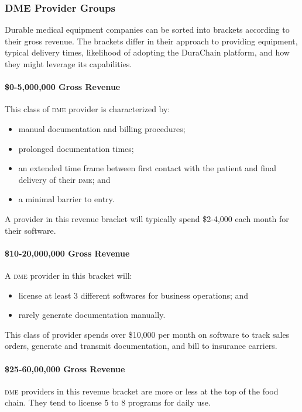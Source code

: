   \subsubsection{DME Provider Groups}
  Durable medical equipment companies can be sorted into brackets according to their gross revenue. The brackets differ in their approach to providing equipment, typical delivery times, likelihood of adopting the DuraChain platform, and how they might leverage its capabilities.%

  \paragraph{\$0-5,000,000 Gross Revenue}
  This class of \textsc{dme} provider is characterized by:%
  \begin{itemize}
    \item manual documentation and billing procedures;
    \item prolonged documentation times;
    \item an extended time frame between first contact with the patient and final delivery of their \textsc{dme}; and
    \item a minimal barrier to entry.
  \end{itemize}
  A provider in this revenue bracket will typically spend \$2-4,000 each month for their software.%

  \paragraph{\$10-20,000,000 Gross Revenue}
  A \textsc{dme} provider in this bracket will:%
  \begin{itemize}
    \item license at least 3 different softwares for business operations; and
    \item rarely generate documentation manually.
  \end{itemize}
  This class of provider spends over \$10,000 per month on software to track sales orders, generate and transmit documentation, and bill to insurance carriers.%

  \paragraph{\$25-60,00,000 Gross Revenue}
  \textsc{dme} providers in this revenue bracket are more or less at the top of the food chain. They tend to license 5 to 8 programs for daily use.%


